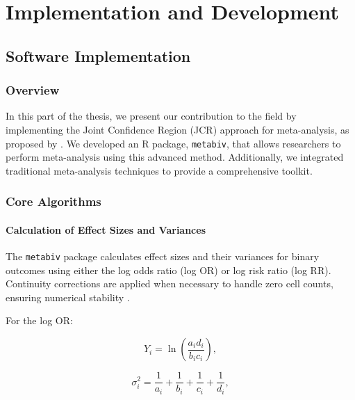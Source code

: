 \documentclass[12pt,a4paper]{report}
\begin{document}
\part{Implementation and Development}

\chapter{Software Implementation}
\label{chap:implementation}

\section{Overview}
\label{sec:overview_implementation}

In this part of the thesis, we present our contribution to the field by implementing the Joint Confidence Region (JCR) approach for meta-analysis, as proposed by \citet{yekutieli2019getting}. We developed an R package, \texttt{metabiv}, that allows researchers to perform meta-analysis using this advanced method. Additionally, we integrated traditional meta-analysis techniques to provide a comprehensive toolkit.

\section{Core Algorithms}
\label{sec:core_algorithms}

\subsection{Calculation of Effect Sizes and Variances}
\label{subsec:effect_sizes_variances}

The \texttt{metabiv} package calculates effect sizes and their variances for binary outcomes using either the log odds ratio (log OR) or log risk ratio (log RR). Continuity corrections are applied when necessary to handle zero cell counts, ensuring numerical stability \citep{sweeting2004}.

For the log OR:

\begin{equation}
\label{eq:log_or}
Y_i = \ln \left( \frac{a_i d_i}{b_i c_i} \right),
\end{equation}

\begin{equation}
\label{eq:var_log_or_package}
\sigma_i^2 = \frac{1}{a_i} + \frac{1}{b_i} + \frac{1}{c_i} + \frac{1}{d_i},
\end{equation}
\end{document}
